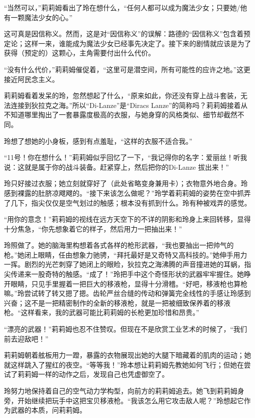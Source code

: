 “当然可以，”莉莉姆看出了玲在想什么，“任何人都可以成为魔法少女；只要她/他有一颗魔法少女的心。”

这可真是因信称义。然而，这是对“因信称义”的误解：路德的“因信称义”包含着预定论；这样一来，谁能成为魔法少女已经事先决定了。接下来的剧情就应该是为了获得（预定的）这颗心，主角需要付出什么代价。

“没有什么代价，”莉莉姆催促着，“这里可是潜空间，所有可能性的应许之地。”这更接近阿民念主义。

莉莉姆看着发呆的玲，忽然想起了什么，“原来如此，你还没有穿上战斗套装，无法连接到狄拉克之海。”所以“Di-Lanze”是“Diracs Lanze”的简称吗？莉莉姆接着从不知道哪里掏出了一套暴露度极高的衣服，与她身穿的风格类似、细节却截然不同。

玲想了想她的小身板，感到有点羞耻，“这样的衣服不适合我。”

“11号！你在想什么！”莉莉姆似乎回忆了一下，“我记得你的名字：爱丽丝！听我说：这就是属于你的战斗装备。赶紧穿上，然后把你的Di-Lanze 拔出来！”

玲只好接过衣服；她立刻就穿好了（此处省略变身兼用卡）；衣物意外地合身。玲感到裸露的肚脐凉飕飕的。“接下来该怎么做呢？”玲学着莉莉姆的姿势在空中抓弄了几下，指尖仅仅是空气划过的触感；根本没有抓到什么。玲有种被戏弄的感觉。

“用你的意念！”莉莉姆的视线在远方天空下的不详的阴影和玲身上来回转移，显得十分焦急，“你先想象着它的样子，然后用力一把抽出来！”

玲照做了。她的脑海里构想着各式各样的枪形武器，“我也要抽出一把帅气的枪。”她闭上眼睛，任由想象力驰骋，“拜托最好是又奇特又高科技的。”她伸手用力一挥。剧烈的光芒刺穿了她闭上的眼睑，狄拉克之海沸腾的声音撞进她的耳蜗，指尖传递来一股奇特的触感。“成了！”玲把手中这个奇怪形状的武器牢牢握住。她睁开眼睛，只见手里握着一把巨大的移液枪，显得十分滑稽。“好吧，移液枪也算枪嘛。”玲尝试转了转又摁了摁。齿轮严丝合缝的传动和弹簧完全线性的手感让玲感到兴奋；这不是一把精密制作的全新的移液枪，就是一把被细致保养着的移液枪。“这样看来，我的武器可能比莉莉姆的长枪更加珍惜和昂贵。”

“漂亮的武器！”莉莉姆也忍不住赞叹。但现在不是欣赏工业艺术的时候了，“我们前去迎敌吧！”

莉莉姆朝着舷板用力一蹬，暴露的衣物展现出她的大腿下暗藏着的肌肉的运动；她就这样跳入了猩红的夜空。“等等我！”玲本想让莉莉姆先教她如何飞行；但她在尝试了莉莉姆一样的动作之后，发现自己也凭虚御空了。

玲努力地保持着自己的空气动力学构型，向前方的莉莉姆追去。她飞到莉莉姆身旁，开始继续把玩手中这把宝贝移液枪。“我该怎么用它攻击敌人呢？”玲想起它作为武器的本质，问莉莉姆。

